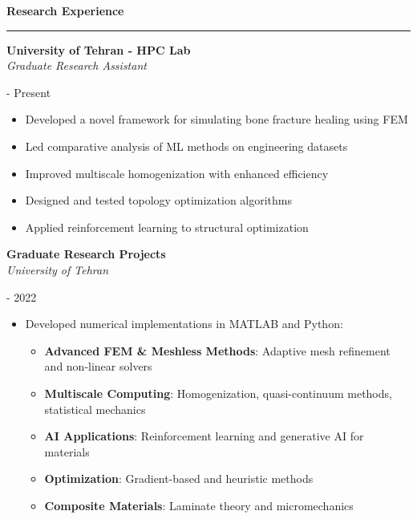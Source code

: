\documentclass[11pt]{article}
\newenvironment{rSection}[1]{
    \vspace{0.8em}
    {\large\bfseries\color{sectiongray} #1}
    \vspace{0.2em}
    \hrule height 0.2pt
    \vspace{0.5em}
}{
    \vspace{0.3em}
}
\newenvironment{rSubsection}[4]{
    \vspace{0.2em}
    \begin{minipage}[t]{0.68\textwidth}
        \raggedright
        \textbf{\color{accentblue}#1} \\ \textit{#3}
    \end{minipage}%
    \hfill%
    \begin{minipage}[t]{0.3\textwidth}
        \raggedleft
        #2 \\ \textit{#4}
    \end{minipage}
    \vspace{0.3em}
    \begin{itemize}
}{
    \end{itemize}
    \vspace{0.2em}
}
\begin{document}
\begin{rSection}{Research Experience}
\begin{rSubsection}{University of Tehran - HPC Lab}{2021 - Present}{Graduate Research Assistant}{}
\item Developed a novel framework for simulating bone fracture healing using FEM
\item Led comparative analysis of ML methods on engineering datasets
\item Improved multiscale homogenization with enhanced efficiency
\item Designed and tested topology optimization algorithms
\item Applied reinforcement learning to structural optimization
\end{rSubsection}

\begin{rSubsection}{Graduate Research Projects}{2019 - 2022}{University of Tehran}{}
\item Developed numerical implementations in MATLAB and Python:
\begin{itemize}
\item \textbf{Advanced FEM \& Meshless Methods}: Adaptive mesh refinement and non-linear solvers
\item \textbf{Multiscale Computing}: Homogenization, quasi-continuum methods, statistical mechanics
\item \textbf{AI Applications}: Reinforcement learning and generative AI for materials
\item \textbf{Optimization}: Gradient-based and heuristic methods
\item \textbf{Composite Materials}: Laminate theory and micromechanics
\end{itemize}
\end{rSubsection}
\end{rSection}
\end{document}
